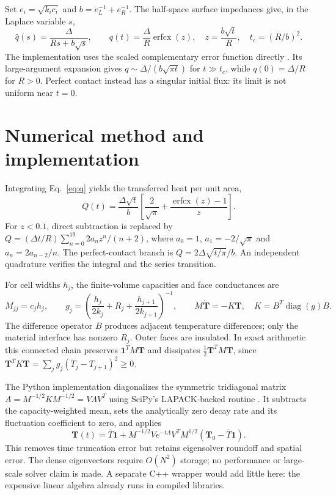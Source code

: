 \documentclass[11pt,a4paper]{article}
\begin{document}
Set $e_i=\sqrt{k_ic_i}$ and $b=e_L^{-1}+e_R^{-1}$. The half-space surface
impedances give, in the Laplace variable $s$,
\begin{equation}
 \widehat q(s)=\frac{\Delta}{Rs+b\sqrt{s}},\qquad
 q(t)=\frac{\Delta}{R}\operatorname{erfcx}(z),\quad
 z=\frac{b\sqrt t}{R},\quad t_c=(R/b)^2. \label{eq:q}
\end{equation}
The implementation uses the scaled complementary error function directly
\cite{erfcx}. Its large-argument expansion \cite{nist} gives
$q\sim\Delta/(b\sqrt{\pi t})$ for $t\gg t_c$, while $q(0)=\Delta/R$ for
$R>0$. Perfect contact instead has a singular initial flux: its limit is not
uniform near $t=0$.
\clearpage

\section{Numerical method and implementation}
Integrating Eq.~\eqref{eq:q} yields the transferred heat per unit area,
\begin{equation}
 Q(t)=\frac{\Delta\sqrt t}{b}
 \left[\frac{2}{\sqrt\pi}+\frac{\operatorname{erfcx}(z)-1}{z}\right].
 \label{eq:heat}
\end{equation}
For $z<0.1$, direct subtraction is replaced by
$Q=(\Delta t/R)\sum_{n=0}^{19}2a_nz^n/(n+2)$, where
$a_0=1$, $a_1=-2/\sqrt\pi$ and $a_n=2a_{n-2}/n$.
The perfect-contact branch is $Q=2\Delta\sqrt{t/\pi}/b$.
An independent quadrature verifies the integral and the series transition.

For cell widths $h_j$, the finite-volume capacities and face conductances are
\begin{equation}
 M_{jj}=c_jh_j,\qquad
 g_j=\left(\frac{h_j}{2k_j}+R_j+\frac{h_{j+1}}{2k_{j+1}}\right)^{-1},\qquad
 M\dot{\boldsymbol T}=-K\boldsymbol T,\quad K=B^T\operatorname{diag}(g)B.
\end{equation}
The difference operator $B$ produces adjacent temperature differences; only the
material interface has nonzero $R_j$. Outer faces are insulated. In exact
arithmetic this connected chain preserves $\boldsymbol 1^TM\boldsymbol T$ and
dissipates $\tfrac12\boldsymbol T^TM\boldsymbol T$, since
$\boldsymbol T^TK\boldsymbol T=\sum_jg_j(T_j-T_{j+1})^2\geq0$.

The Python implementation diagonalizes the symmetric tridiagonal matrix
$A=M^{-1/2}KM^{-1/2}=V\Lambda V^T$ using SciPy's LAPACK-backed routine
\cite{eigh}. It subtracts the capacity-weighted mean, sets the analytically zero
decay rate and its fluctuation coefficient to zero, and applies
\begin{equation}
 \boldsymbol T(t)=\bar T\boldsymbol1+
 M^{-1/2}V e^{-t\Lambda}V^T M^{1/2}(\boldsymbol T_0-\bar T\boldsymbol1).
\end{equation}
This removes time truncation error but retains eigensolver roundoff and spatial
error. The dense eigenvectors require $O(N^2)$ storage; no performance or
large-scale solver claim is made. A separate C++ wrapper would add little here:
the expensive linear algebra already runs in compiled libraries.
\end{document}
